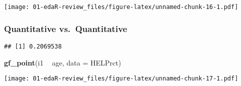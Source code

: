 \documentclass[]{article}
\newenvironment{Shaded}{\begin{snugshade}}{\end{snugshade}}
\newcommand{\KeywordTok}[1]{\textcolor[rgb]{0.13,0.29,0.53}{\textbf{#1}}}
\newcommand{\DataTypeTok}[1]{\textcolor[rgb]{0.13,0.29,0.53}{#1}}
\newcommand{\StringTok}[1]{\textcolor[rgb]{0.31,0.60,0.02}{#1}}
\newcommand{\OperatorTok}[1]{\textcolor[rgb]{0.81,0.36,0.00}{\textbf{#1}}}
\newcommand{\NormalTok}[1]{#1}
\begin{document}
\texttt{[image: 01-edaR-review\_files/figure-latex/unnamed-chunk-16-1.pdf]}

\subsubsection{Quantitative
vs.~Quantitative}\label{quantitative-vs.quantitative}

\begin{Shaded}
\end{Shaded}

\begin{verbatim}
## [1] 0.2069538
\end{verbatim}

\begin{Shaded}
\begin{Highlighting}[]
\KeywordTok{gf_point}\NormalTok{(i1 }\OperatorTok{~}\StringTok{ }\NormalTok{age, }\DataTypeTok{data =}\NormalTok{ HELPrct)}
\end{Highlighting}
\end{Shaded}

\texttt{[image: 01-edaR-review\_files/figure-latex/unnamed-chunk-17-1.pdf]}
\end{document}
